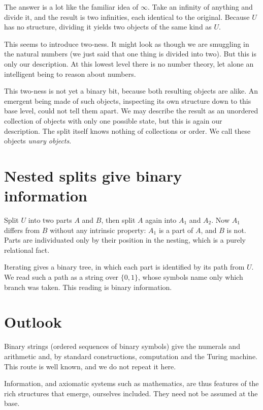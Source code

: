 \documentclass[11pt]{book}
\begin{document}
The answer is a lot like the familiar idea of $\infty$. Take an infinity of
anything and divide it, and the result is two infinities, each identical to the
original. Because $U$ has no structure, dividing it yields two objects of the same
kind as $U$.

This seems to introduce two-ness. It might look as though we are smuggling in the
natural numbers (we just said that one thing is divided into two). But this is only
our description. At this lowest level there is no number theory, let alone an
intelligent being to reason about numbers.

This two-ness is not yet a binary bit, because both resulting objects are alike. An
emergent being made of such objects, inspecting its own structure down to this base
level, could not tell them apart. We may describe the result as an unordered
collection of objects with only one possible state, but this is again our
description. The split itself knows nothing of collections or order. We call these
objects \emph{unary objects}.

\section{Nested splits give binary information}

Split $U$ into two parts $A$ and $B$, then split $A$ again into $A_1$ and $A_2$.
Now $A_1$ differs from $B$ without any intrinsic property: $A_1$ is a part of $A$,
and $B$ is not. Parts are individuated only by their position in the nesting, which
is a purely relational fact.

Iterating gives a binary tree, in which each part is identified by its path from
$U$. We read such a path as a string over $\{0,1\}$, whose symbols name only which
branch was taken. This reading is binary information.

\section{Outlook}

Binary strings (ordered sequences of binary symbols) give the numerals and
arithmetic and, by standard constructions, computation and the Turing machine. This
route is well known, and we do not repeat it here.

Information, and axiomatic systems such as mathematics, are thus features of the
rich structures that emerge, ourselves included. They need not be assumed at the
base.
\end{document}
